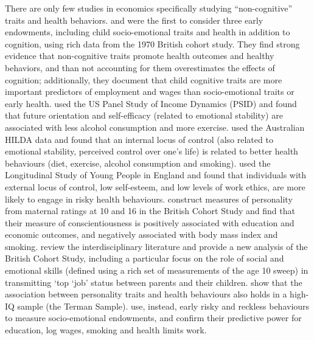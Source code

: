 There are only few studies in economics specifically studying ``non-cognitive'' traits and health behaviors. \citet{Conti2010a} and \citet{Conti2011} were the first to consider three early endowments, including child socio-emotional traits and health in addition to cognition, using rich data from the 1970 British cohort study. They find strong evidence that non-cognitive traits promote health outcomes and healthy behaviors, and than not accounting for them overestimates the effects of cognition; additionally, they document that child cognitive traits are more important predictors of employment and wages than socio-emotional traits or early health. \citet{Chiteji2010} used the US Panel Study of Income Dynamics (PSID) and found that future orientation and self-efficacy (related to emotional stability) are associated with less alcohol consumption and more exercise. \citet{Cobb-Clark2014} used the Australian HILDA data and found that an internal locus of control (also related to emotional stability, perceived control over one's life) is related to better health behaviours (diet, exercise, alcohol consumption and smoking). \citet{Mendolia2014a} used the Longitudinal Study of Young People in England and found that individuals with external locus of control, low self-esteem, and low levels of work ethics, are more likely to engage in risky health behaviours. \citet{Prevoo2015} construct measures of personality from maternal ratings at 10 and 16 in the British Cohort Study and find that their measure of conscientiousness is positively associated with education and economic outcomes, and negatively associated with body mass index and smoking. \citet{Goodman2015} review the interdisciplinary literature and provide a new analysis of the British Cohort Study, including a particular focus on the role of social and emotional skills (defined using a rich set of measurements of the age 10 sweep) in transmitting `top `job' status between parents and their children. \citet{Savelyev2019} show that the association between personality traits and health behaviours also holds in a high-IQ sample (the Terman Sample). \citet{Heckman2018} use, instead, early risky and reckless behaviours to measure socio-emotional endowments, and confirm their predictive power for education, log wages, smoking and health limits work.

